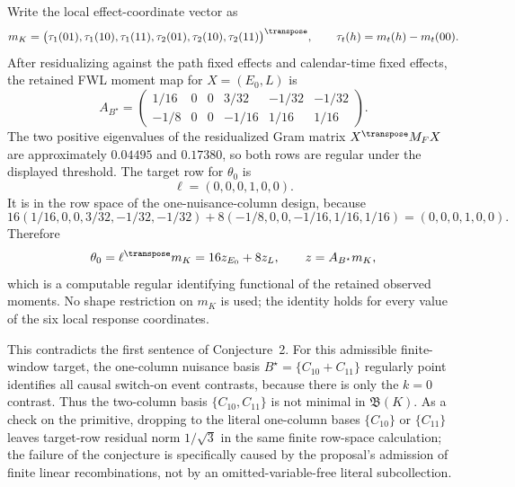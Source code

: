 Write the local effect-coordinate vector as
\[
m_K=
\bigl(
\tau_1(01),\tau_1(10),\tau_1(11),
\tau_2(01),\tau_2(10),\tau_2(11)
\bigr)^\transpose,
\qquad
\tau_t(h)=m_t(h)-m_t(00).
\]
After residualizing against the path fixed effects and calendar-time fixed effects, the retained FWL moment map for \(X=(E_0,L)\) is
\[
A_{B^\star}=
\begin{pmatrix}
1/16 & 0 & 0 & 3/32 & -1/32 & -1/32\\
-1/8 & 0 & 0 & -1/16 & 1/16 & 1/16
\end{pmatrix}.
\]
The two positive eigenvalues of the residualized Gram matrix \(X^\transpose M_FX\) are approximately \(0.04495\) and \(0.17380\), so both rows are regular under the displayed threshold.
The target row for \(\theta_0\) is
\[
\ell=(0,0,0,1,0,0).
\]
It is in the row space of the one-nuisance-column design, because
\[
16(1/16,0,0,3/32,-1/32,-1/32)
+8(-1/8,0,0,-1/16,1/16,1/16)
=(0,0,0,1,0,0).
\]
Therefore
\[
\theta_0=\ell^\transpose m_K
=16 z_{E_0}+8 z_L,
\qquad
z=A_{B^\star}m_K,
\]
which is a computable regular identifying functional of the retained observed moments.
No shape restriction on \(m_K\) is used; the identity holds for every value of the six local response coordinates.

This contradicts the first sentence of Conjecture~2.
For this admissible finite-window target, the one-column nuisance basis \(B^\star=\{C_{10}+C_{11}\}\) regularly point identifies all causal switch-on event contrasts, because there is only the \(k=0\) contrast.
Thus the two-column basis \(\{C_{10},C_{11}\}\) is not minimal in \(\mathfrak B(K)\).
As a check on the primitive, dropping to the literal one-column bases \(\{C_{10}\}\) or \(\{C_{11}\}\) leaves target-row residual norm \(1/\sqrt{3}\) in the same finite row-space calculation; the failure of the conjecture is specifically caused by the proposal's admission of finite linear recombinations, not by an omitted-variable-free literal subcollection.
